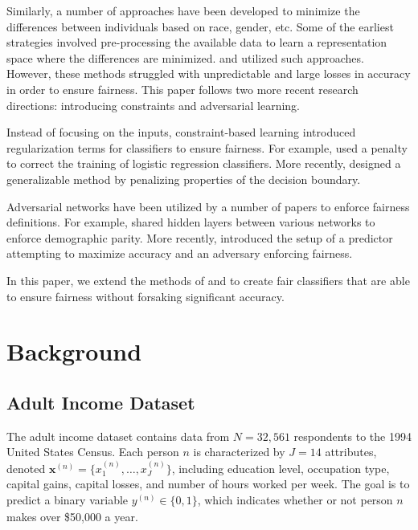 \documentclass{article}
\newcommand{\bd}[1]{\boldsymbol{#1}}
\newcommand{\idx}[3][]{{#2}^{(#3)}_{#1}}
\newcommand{\bidx}[3][]{\bd{#2}^{(#3)}_{#1}}
\begin{document}
Similarly, a number of approaches have been developed to minimize the differences between individuals based on race, gender, etc. Some of the earliest strategies involved pre-processing the available data to learn a representation space where the differences are minimized. \citet{dwork2012fairness} and  \citet{feldman2015certifying} utilized such approaches. However, these methods struggled with unpredictable and large losses in accuracy in order to ensure fairness. This paper follows two more recent research directions: introducing constraints and adversarial learning.

Instead of focusing on the inputs, constraint-based learning introduced regularization terms for classifiers to ensure fairness. For example, \citet{kamishima2012fairness} used a penalty to correct the training of logistic regression classifiers. More recently, \citet{zafar2015fairness} designed a generalizable method by penalizing properties of the decision boundary.

Adversarial networks have been utilized by a number of papers to enforce fairness definitions. For example, \citet{beutel2017data} shared hidden layers between various networks to enforce demographic parity. More recently, \citet{wadsworth2018achieving} introduced the setup of a predictor attempting to maximize accuracy and an adversary enforcing fairness.

In this paper, we extend the methods of \citet{zafar2015fairness} and \citet{wadsworth2018achieving} to create fair classifiers that are able to ensure fairness without forsaking significant accuracy.

\section{Background}

\subsection{Adult Income Dataset}

The adult income dataset \citep{kohavi1996scaling} contains data from $N = 32,561$ respondents to the 1994 United States Census.  Each person $n$ is characterized by $J = 14$ attributes, denoted $\bidx x n = \{\idx[1] x n, \ldots, \idx[J] x n\}$, including education level, occupation type, capital gains, capital losses, and number of hours worked per week.  The goal is to predict a binary variable $\idx y n \in \{0, 1\}$, which indicates whether or not person $n$ makes over \$50,000 a year.
\end{document}
